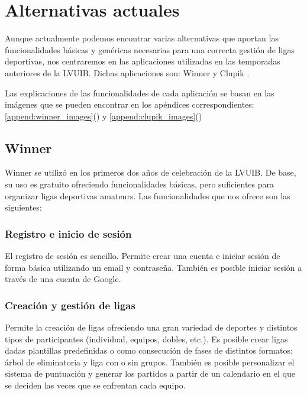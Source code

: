 \section{Alternativas actuales}

Aunque actualmente podemos encontrar varias alternativas que aportan las funcionalidades básicas y genéricas necesarias para una correcta gestión de ligas deportivas, nos centraremos en las aplicaciones utilizadas en las temporadas anteriores de la \ac{LVUIB}. Dichas aplicaciones son: Winner \cite{app:winner} y Clupik \cite{app:clupik}.

Las explicaciones de las funcionalidades de cada aplicación se basan en las imágenes que se pueden encontrar en los apéndices correspondientes: \ref{append:winner_images}() y \ref{append:clupik_images}()

\subsection{Winner}

Winner se utilizó en los primeros dos años de celebración de la \ac{LVUIB}. De base, su uso es gratuito ofreciendo funcionalidades básicas, pero suficientes para organizar ligas deportivas amateurs. Las funcionalidades que nos ofrece son las siguientes:

\subsubsection*{Registro e inicio de sesión}

El registro de sesión es sencillo. Permite crear una cuenta e iniciar sesión de forma básica utilizando un email y contraseña. También es posible iniciar sesión a través de una cuenta de Google.

\subsubsection*{Creación y gestión de ligas}

Permite la creación de ligas ofreciendo una gran variedad de deportes y distintos tipos de participantes (individual, equipos, dobles, etc.). Es posible crear ligas dadas plantillas predefinidas o como consecución de fases de distintos formatos: árbol de eliminatoria y liga con o sin grupos. También es posible personalizar el sistema de puntuación y generar los partidos a partir de un calendario en el que se deciden las veces que se enfrentan cada equipo.

